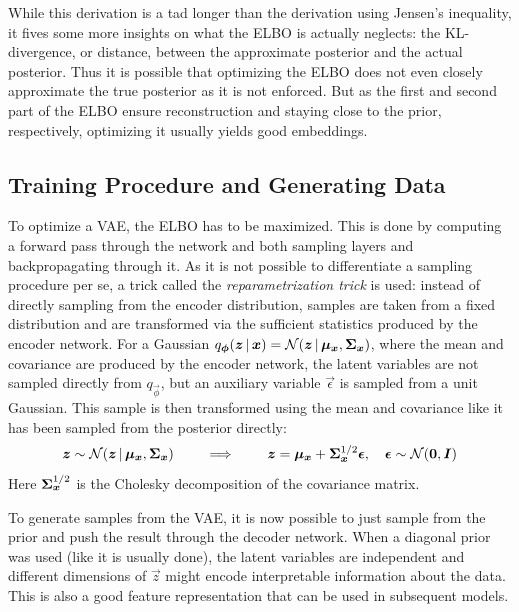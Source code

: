 					While this derivation is a tad longer than the derivation using Jensen's inequality, it fives some more insights on what the ELBO is actually neglects: the KL-divergence, or distance, between the approximate posterior and the actual posterior. Thus it is possible that optimizing the ELBO does not even closely approximate the true posterior as it is not enforced. But as the first and second part of the ELBO ensure reconstruction and staying close to the prior, respectively, optimizing it usually yields good embeddings.

		\subsection{Training Procedure and Generating Data}
			To optimize a VAE, the ELBO has to be maximized. This is done by computing a forward pass through the network and both sampling layers and backpropagating through it. As it is not possible to differentiate a sampling procedure per se, a trick called the \emph{reparametrization trick} is used: instead of directly sampling from the encoder distribution, samples are taken from a fixed distribution and are transformed via the sufficient statistics produced by the encoder network. For a Gaussian \( q_{\bm{\phi}}(\bm{z} \,\vert\, \bm{x}) = \mathcal{N}(\bm{z} \,\vert\, \bm{\mu}_{\bm{x}}, \bm{\Sigma}_{\bm{x}}) \), where the mean and covariance are produced by the encoder network, the latent variables are not sampled directly from \( q_{\vec{\phi}} \), but an auxiliary variable \( \vec{\epsilon} \) is sampled from a unit Gaussian. This sample is then transformed using the mean and covariance like it has been sampled from the posterior directly:
			\begin{equation}
				\bm{z} \sim \mathcal{N}(\bm{z} \,\vert\, \bm{\mu}_{\bm{x}}, \bm{\Sigma}_{\bm{x}})
				\qquad\implies\qquad
				\bm{z} = \bm{\mu}_{\bm{x}} + \bm{\Sigma}_{\bm{x}}^{1/2} \bm{\epsilon},\quad \bm{\epsilon} \sim \mathcal{N}(\bm{0}, \bm{I})
			\end{equation}
			Here \( \bm{\Sigma}_{\bm{x}}^{1/2} \) is the Cholesky decomposition of the covariance matrix.

			To generate samples from the VAE, it is now possible to just sample from the prior and push the result through the decoder network. When a diagonal prior was used (like it is usually done), the latent variables are independent and different dimensions of \(\vec{z}\) might encode interpretable information about the data. This is also a good feature representation that can be used in subsequent models.

